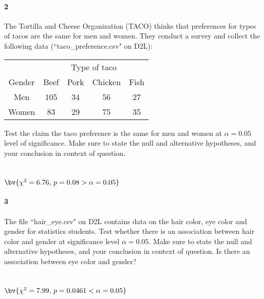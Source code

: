 \documentclass{article}
\begin{document}
\begin{flushleft}
\paragraph{2} The Tortilla and Cheese Organization (TACO) thinks that preferences for types of tacos are the same for men and women. They conduct a survey and collect the following data (``taco\_preference.csv" on D2L):\\
\medskip
{\centering
\begin{tabular}{c | c  c c c}
\multicolumn{1}{c}{} & \multicolumn{4}{c}{\large Type of taco}\\
Gender & Beef & Pork & Chicken & Fish\\
\hline
Men & 105 & 34 & 56 & 27\\
Women & 83 & 29 & 75 & 35 \\
\end{tabular}
\par}
\bigskip
Test the claim the taco preference is the same for men and women at $\alpha = 0.05$ level of significance. Make sure to state the null and alternative hypotheses, and your conclusion in context of question.\\
\medskip
{}\\
\\
\medskip
{}$\bv{\chi^2 = 6.76, \, p = 0.08 > \alpha = 0.05}$\\


\vspace{.5in}
\paragraph{3} The file ``hair\_eye.csv" on D2L contains data on the hair color, eye color and gender for statistics students. Test whether there is an association between hair color and gender at significance level $\alpha=0.05$. Make sure to state the null and alternative hypotheses, and your conclusion in context of question. Is there an association between eye color and gender?\\
\medskip
{}\\
\\
\medskip
{}$\bv{\chi^2 = 7.99, \, p = 0.0461 < \alpha = 0.05}$\\



\end{flushleft}
\end{document}
